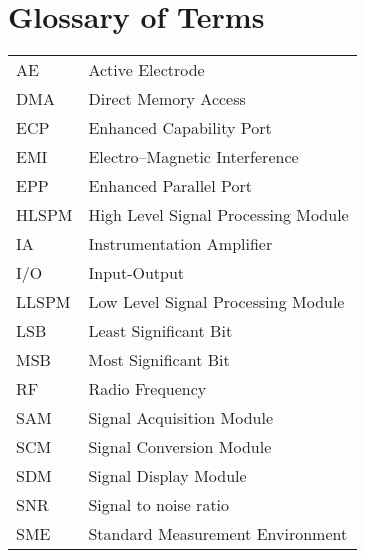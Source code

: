 \chapter{Glossary of Terms}
\label{appendix:glossary}

\begin{center}
\begin{tabular}[ht]{|l|l|} 	\hline	
	 AE & Active Electrode \\
	 DMA & Direct Memory Access \\
	 ECP & Enhanced Capability Port \\
	 EMI & Electro--Magnetic Interference \\
	 EPP &  Enhanced Parallel Port \\
	 HLSPM & High Level Signal Processing Module \\
	 IA & Instrumentation Amplifier \\
	 I/O & Input-Output \\
	 LLSPM & Low Level Signal Processing Module \\
	 LSB & Least Significant Bit \\
	 MSB & Most Significant Bit \\
	 RF & Radio Frequency \\
	 SAM & Signal Acquisition Module \\
	 SCM & Signal Conversion Module \\
	 SDM & Signal Display Module \\
	 SNR & Signal to noise ratio \\
	 SME & Standard Measurement Environment \\
	\hline
\end{tabular}
\end{center}
